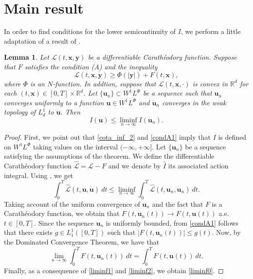 \documentclass[twoside]{elsarticle}
\newtheorem{lem}[thm]{Lemma}
\theoremstyle{remark}
\newcommand{\lphi}{L^{\Phi}}
\newcommand{\wphi}{W^{1}\lphi}
\renewcommand{\b}[1]{\boldsymbol{#1}}
\newcommand{\rr}{\mathbb{R}}
\renewcommand{\leq}{\leqslant}
\begin{document}
\section{Main result}\label{sec:main}


In order to find conditions for the lower semicontinuity of  $I$, 
we perform a little adaptation of  a result of \cite{ekeland1999convex}. 



\begin{lem}\label{semicontinf}
Let $\mathcal{L}(t,\b{x},\b{y})$ be a  differentiable Carath\'eodory function. Suppose that  $F$ satisfies the condition (A) and the inequality
\begin{equation}\label{cota_inf_2}
\mathcal{L}(t,\b{x},\b{y})\geq \Phi\left(|\b{y}|\right)+ F(t,\b{x}),
\end{equation}
where $\Phi$ is an $N$-function. 
In addtion, suppose that  $\mathcal{L}(t,\b{x},\cdot)$ is convex in $\rr^d$ for each $(t,\b{x})\in [0,T]\times\rr^d$.  Let $\{\b{u}_n\}\subset\wphi$ be a sequence such that $\b{u}_n$ converges  uniformly  to a function $\b{u}\in\wphi$ and $\b{\dot{u}}_n$ converges in the weak topology of $L^1_d$ to $\b{\dot{u}}$.   Then
\begin{equation}\label{liminf0}I(\b{u})\leq \liminf_{n\to\infty}I(\b{u}_n).
\end{equation}

\end{lem}

\begin{proof} First, we point out that \eqref{cota_inf_2} and \eqref{condA1} imply that $I$ is defined on $\wphi$ taking values on the interval $(-\infty,+\infty]$. 
Let $\{\b{u}_n\}$ be a sequence  satisfying the assumptions of the theorem.   We define the differentiable Carath\'eodory function $\mathcal{\hat{L}}=\mathcal{L}-F$ and we denote by $\hat{I}$ its  associated action integral. Using  \cite[Thm. 2.1, p. 243]{ekeland1999convex}, we get
\begin{equation}\label{liminf1}
\int_0^T\mathcal{\hat{L}}(t,\b{u},\b{\dot{u}})\ dt\leq \liminf_{n\to\infty}\int_0^T\mathcal{\hat{L}}(t,\b{u}_n,\b{\dot{u}}_n)\ dt.
\end{equation}
Taking account of the uniform convergence of $\b{u}_n$ and the fact that  $F$  is a  Carath\'eodory function,  we obtain that $F(t,\b{u}_n(t))\to F(t,\b{u}(t))$ a.e. $t\in[0,T]$.  Since the sequence $\b{u}_n$ is uniformly bounded, from \eqref{condA1} follows that there exists $g\in L_1^1([0,T])$ such that $|F(t,\b{u}_n(t))|\leq g(t)$. Now, by the Dominated Convergence Theorem, we have that 
\begin{equation}\label{liminf2}
\lim_{n\to\infty}\int_0^TF(t,\b{u}_n(t))\ dt=\int_0^TF(t,\b{u}(t))\ dt.
\end{equation}
Finally, as a consequence of  \eqref{liminf1} and  \eqref{liminf2}, we obtain \eqref{liminf0}.

\end{proof}
\end{document}
